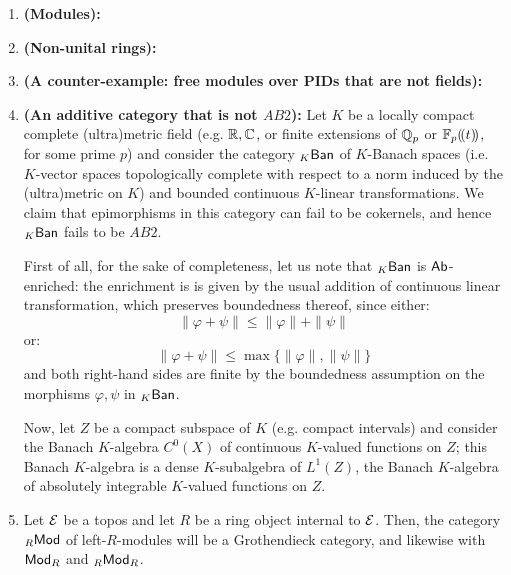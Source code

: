                 \begin{example} \label{examples: AB_categories}
                    \noindent
                    \begin{enumerate}
                        \item \textbf{(Modules):}
                        \item \textbf{(Non-unital rings):}
                        \item \textbf{(A counter-example: free modules over PIDs that are not fields):}
                        \item \textbf{(An additive category that is not $AB2$):} Let $K$ be a locally compact complete (ultra)metric field (e.g. $\mathbb{R}, \mathbb{C}$, or finite extensions of $\mathbb{Q}_p$ or $\mathbb{F}_p(\!(t)\!)$, for some prime $p$) and consider the category ${}_K\mathsf{Ban}$ of $K$-Banach spaces (i.e. $K$-vector spaces topologically complete with respect to a norm induced by the (ultra)metric on $K$) and bounded continuous $K$-linear transformations. We claim that epimorphisms in this category can fail to be cokernels, and hence ${}_K\mathsf{Ban}$ fails to be $AB2$.
                        
                        First of all, for the sake of completeness, let us note that ${}_K\mathsf{Ban}$ is $\mathsf{Ab}$-enriched: the enrichment is is given by the usual addition of continuous linear transformation, which preserves boundedness thereof, since either:
                            $$\|\varphi + \psi\| \leq \|\varphi\| + \|\psi\|$$
                        or:
                            $$\|\varphi + \psi\| \leq \max\{\|\varphi\|, \|\psi\|\}$$
                        and both right-hand sides are finite by the boundedness assumption on the morphisms $\varphi, \psi$ in ${}_K\mathsf{Ban}$.
                        
                        Now, let $Z$ be a compact subspace of $K$ (e.g. compact intervals) and consider the Banach $K$-algebra $C^0(X)$ of continuous $K$-valued functions on $Z$; this Banach $K$-algebra is a dense $K$-subalgebra of $L^1(Z)$, the Banach $K$-algebra of absolutely integrable $K$-valued functions on $Z$.
                        \item Let $\mathcal{E}$ be a topos and let $R$ be a ring object internal to $\mathcal{E}$. Then, the category ${}_R\mathsf{Mod}$ of left-$R$-modules will be a Grothendieck category, and likewise with $\mathsf{Mod}_R$ and ${}_R\mathsf{Mod}_R$.
                    \end{enumerate}
                \end{example}
                
